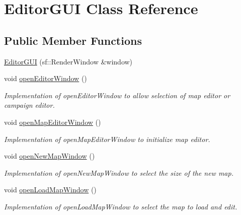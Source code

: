 \hypertarget{class_editor_g_u_i}{}\section{Editor\+G\+UI Class Reference}
\label{class_editor_g_u_i}
\subsection*{Public Member Functions}
\begin{DoxyCompactItemize}
\item 
\hyperlink{class_editor_g_u_i_a9b5d98aacd3392b5c8f15b0a7e305bed}{Editor\+G\+UI} (sf\+::\+Render\+Window \&window)
\item 
\hypertarget{class_editor_g_u_i_a3fa7a8b494f2d6db6a871b53e3c670ff}{}\label{class_editor_g_u_i_a3fa7a8b494f2d6db6a871b53e3c670ff} 
void \hyperlink{class_editor_g_u_i_a3fa7a8b494f2d6db6a871b53e3c670ff}{open\+Editor\+Window} ()
\begin{DoxyCompactList}\small\item\em Implementation of open\+Editor\+Window to allow selection of map editor or campaign editor. \end{DoxyCompactList}\item 
\hypertarget{class_editor_g_u_i_af427d199861fff95e333113aeb4b1dcb}{}\label{class_editor_g_u_i_af427d199861fff95e333113aeb4b1dcb} 
void \hyperlink{class_editor_g_u_i_af427d199861fff95e333113aeb4b1dcb}{open\+Map\+Editor\+Window} ()
\begin{DoxyCompactList}\small\item\em Implementation of open\+Map\+Editor\+Window to initialize map editor. \end{DoxyCompactList}\item 
\hypertarget{class_editor_g_u_i_a4857cb67f85c8f8a4213e5718d44316b}{}\label{class_editor_g_u_i_a4857cb67f85c8f8a4213e5718d44316b} 
void \hyperlink{class_editor_g_u_i_a4857cb67f85c8f8a4213e5718d44316b}{open\+New\+Map\+Window} ()
\begin{DoxyCompactList}\small\item\em Implementation of open\+New\+Map\+Window to select the size of the new map. \end{DoxyCompactList}\item 
\hypertarget{class_editor_g_u_i_ae36efa4acd276b709953c277601f5768}{}\label{class_editor_g_u_i_ae36efa4acd276b709953c277601f5768} 
void \hyperlink{class_editor_g_u_i_ae36efa4acd276b709953c277601f5768}{open\+Load\+Map\+Window} ()
\begin{DoxyCompactList}\small\item\em Implementation of open\+Load\+Map\+Window to select the map to load and edit. \end{DoxyCompactList}\item 

\end{DoxyCompactItemize}
